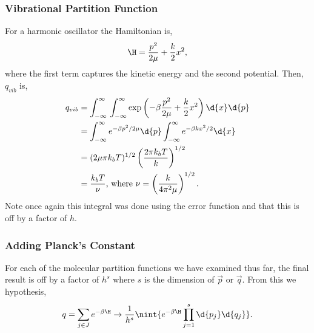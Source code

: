 \subsubsection{Vibrational Partition Function}
For a harmonic oscillator the Hamiltonian is,
\begin{equation*}
	\H = \frac{p^{2}}{2\mu} + \frac{k}{2}x^{2},
\end{equation*}
where the first term captures the kinetic energy and the second potential. Then,
$q_{vib}$ is,
\begin{align*}
	q_{vib} &= \int_{-\infty}^{\infty}{} \int_{-\infty}^{\infty}{\exp \left(
	-\beta\frac{p^{2}}{2\mu} + \frac{k}{2}x^{2}\right) \d{x}\d{p}}\\
			&= \int_{-\infty}^{\infty}{e^{-\beta p^{2}/2\mu}\d{p}}
			\int_{-\infty}^{\infty}{e^{-\beta kx^{2}/2}\d{x}}\\
			&= (2\mu\pi k_b T)^{1/2}\left(\frac{2\pi k_b T}{k}\right)^{1/2}\\
			&= \frac{k_b T}{\nu} \text{, where } \nu =
			\left(\frac{k}{4\pi^{2}\mu}\right)^{1/2}.
\end{align*}
Note once again this integral was done using the error function and that this is
off by a factor of $h$.

\subsubsection{Adding Planck's Constant}
For each of the molecular partition functions we have examined thus far, the
final result is off by a factor of $h^{s}$ where $s$ is the dimension of
$\vec{p}$ or $\vec{q}$. From this we hypothesis,
\begin{equation*}
	q = \sum_{j\in J}{e^{-\beta\H}} \to \frac{1}{h^{s}}
	\nint{e^{-\beta\H} \prod_{j=1}^{s}{\d{p_{j}}\d{q_{j}}}}.
\end{equation*}

